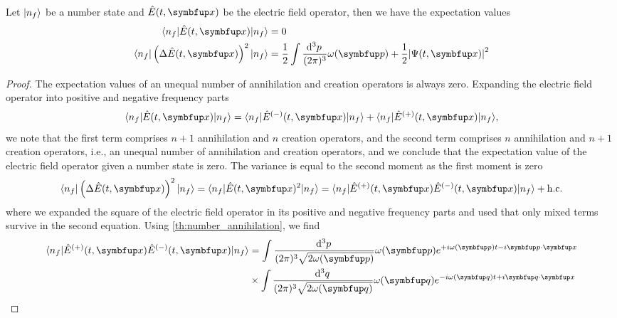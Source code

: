 \begin{theorem}
	Let $\lvert n_f\rangle$ be a number state and $\hat{E}(t,\vb{x})$ be the electric field operator,
	then we have the expectation values
	\begin{align}
		\bra{n_f}
		\hat{E}(t,\vb{x})
		\ket{n_f}
		&=
		0
		\\
		\bra{n_f}
		\left(
			\Delta
			\hat{E}(t,\vb{x})
		\right)^2
		\ket{n_f}
		&=
		\frac{1}{2}
		\int\frac{\dd[3]{p}}{(2\pi)^3}
		\omega(\vb{p})
		+
		\frac{1}{2}
		\abs*{\Psi(t,\vb{x})}^2
	\end{align}
\end{theorem}
\begin{proof}
	The expectation values of an unequal number of annihilation and creation operators is always zero.
	Expanding the electric field operator into positive and negative frequency parts
	\begin{equation}
		\bra{n_f}
		\hat{E}(t,\vb{x})
		\ket{n_f}
		=
		\bra{n_f}
		\hat{E}^{(-)}(t,\vb{x})
		\ket{n_f}
		+
		\bra{n_f}
		\hat{E}^{(+)}(t,\vb{x})
		\ket{n_f}
		,
	\end{equation}
	we note that the first term comprises $n+1$ annihilation and $n$ creation operators, and the second term comprises $n$ annihilation and $n+1$ creation operators, i.e., an unequal number of annihilation and creation operators, and we conclude that the expectation value of the electric field operator given a number state is zero.
	The variance is equal to the second moment as the first moment is zero
	\begin{equation}
		\bra{n_f}
		\left(
			\Delta
			\hat{E}(t,\vb{x})
		\right)^2
		\ket{n_f}
		=
		\bra{n_f}
		\hat{E}(t,\vb{x})^2
		\ket{n_f}
		=
		\bra{n_f}
		\hat{E}^{(+)}(t,\vb{x})
		\hat{E}^{(-)}(t,\vb{x})
		\ket{n_f}
		+
		\text{h.c.}
	\end{equation}
	where we expanded the square of the electric field operator in its positive and negative frequency parts and used that only mixed terms survive in the second equation.
	Using \cref{th:number_annihilation}, we find
	\begin{equation}
		\begin{split}
			\bra{n_f}
			\hat{E}^{(+)}(t,\vb{x})
			\hat{E}^{(-)}(t,\vb{x})
			\ket{n_f}
			&=
			\int\frac{\dd[3]{p}}{(2\pi)^3\sqrt{2\omega(\vb{p})}}
			\omega(\vb{p})
			e^{+i\omega(\vb{p})t-i\vb{p}\vdot\vb{x}}
			\\
			&\times
			\int\frac{\dd[3]{q}}{(2\pi)^3\sqrt{2\omega(\vb{q})}}
			\omega(\vb{q})
			e^{-i\omega(\vb{q})t+i\vb{q}\vdot\vb{x}}
			\\

\end{split}
\end{equation}
\end{proof}

